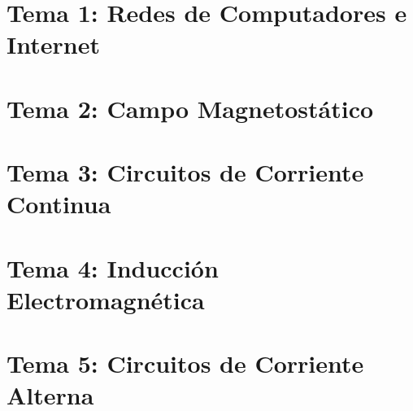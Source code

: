 \renewcommand{\contentsname}{Indice}
\tableofcontents
\newpage
\section{Tema 1: Redes de Computadores e Internet}

\newpage
\section{Tema 2: Campo Magnetostático}

\newpage
\section{Tema 3: Circuitos de Corriente Continua}

\newpage
\section{Tema 4: Inducción Electromagnética}

\newpage
\section{Tema 5: Circuitos de Corriente Alterna}

